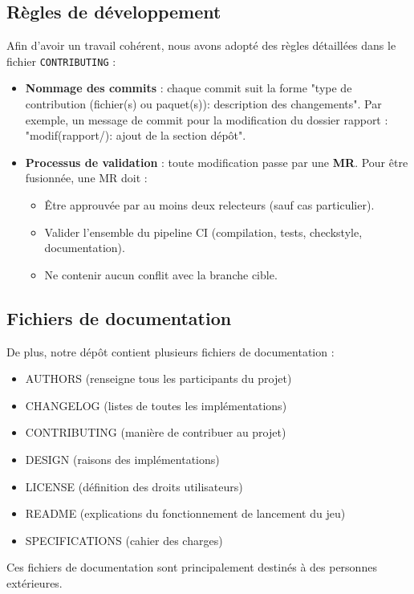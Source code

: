 \documentclass[a4paper, 12pt]{article}
\begin{document}
        \subsection{Règles de développement}
            Afin d'avoir un travail cohérent, nous avons adopté des règles détaillées dans le fichier \texttt{CONTRIBUTING} :
            \begin{itemize}
                \item \textbf{Nommage des commits} : chaque commit suit la forme "type de contribution (fichier(s) ou paquet(s)): description des changements". Par exemple, un message de commit pour la modification du dossier rapport : "modif(rapport/): ajout de la section dépôt".
                \item \textbf{Processus de validation} : toute modification passe par une \textbf{MR}. Pour être fusionnée, une MR doit :
                \begin{itemize}
                    \item Être approuvée par au moins deux relecteurs (sauf cas particulier).
                    \item Valider l'ensemble du pipeline CI (compilation, tests, checkstyle, documentation).
                    \item Ne contenir aucun conflit avec la branche cible.
                \end{itemize}
            \end{itemize}
        
        \subsection{Fichiers de documentation}
            De plus, notre dépôt contient plusieurs fichiers de documentation :
            \begin{itemize}
                \item AUTHORS (renseigne tous les participants du projet)
                \item CHANGELOG (listes de toutes les implémentations)
                \item CONTRIBUTING (manière de contribuer au projet)
                \item DESIGN (raisons des implémentations)
                \item LICENSE (définition des droits utilisateurs)
                \item README (explications du fonctionnement de lancement du jeu)
                \item SPECIFICATIONS (cahier des charges)
            \end{itemize}
            Ces fichiers de documentation sont principalement destinés à des personnes extérieures.
\end{document}
